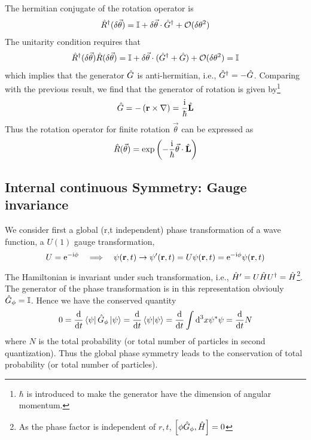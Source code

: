 The hermitian conjugate of the rotation operator is 
\begin{align}
    \hat{R}^ \dag(\delta \vec{\theta}) = \mathbb{I} + \delta \vec{\theta} \cdot \hat G^ \dag+ \mathcal{O}(\delta \theta^2)
\end{align}
The unitarity condition requires that
\begin{align}
    \hat{R}^ \dag(\delta \vec{\theta}) \hat{R}(\delta \vec{\theta}) = \mathbb{I} + \delta \vec{\theta} \cdot (\hat G^ \dag + \hat G) + \mathcal{O}(\delta \theta^2) = \mathbb{I}
\end{align}
which implies that the generator $\hat G$ is anti-hermitian, i.e., $\hat G^ \dag = - \hat G$. Comparing with the previous result, we find that the generator of rotation is given by\footnote{$\hbar$ is introduced to make the generator have the dimension of angular momentum.}
\begin{align}
    \hat G = - \left(\mathbf{r} \times \nabla \right) = \frac{\mathrm{i}}{\hbar} \hat{\mathbf{L}}
\end{align}
Thus the rotation operator for finite rotation $\vec{\theta}$ can be expressed as
\begin{align}
    \hat{R}(\vec{\theta}) = \exp\left(- \frac{\mathrm{i}}{\hbar} \vec{\theta} \cdot \hat{\mathbf{L}}\right)    
\end{align}

\subsection{Internal continuous Symmetry: Gauge invariance}
We consider first a global (r,t independent) phase transformation of a wave function, a $U(1)$ gauge transformation, 
\begin{align}
    U = \mathrm{e}^{- \mathrm{i} \phi} \quad \Longrightarrow \quad \psi(\mathbf{r},t) \rightarrow \psi'(\mathbf{r},t) = U \psi(\mathbf{r},t) = \mathrm{e}^{- \mathrm{i} \phi} \psi(\mathbf{r},t)
\end{align}
The Hamiltonian is invariant under such transformation, i.e., $\hat{H}' = U \hat{H} U^ \dag = \hat{H}$\footnote{As the phase factor is independent of $r,t$, $\left[ \phi \hat G_ \phi , \hat{H} \right] = 0$}. The generator of the phase transformation is in this representation obviouly $\hat G_ \phi = \mathbb{I}$. Hence we have the conserved quantity 
\begin{align}
    0 = \frac{\mathrm{d}}{\mathrm{d} t} \bra{\psi} \hat G_ \phi \ket{\psi} = \frac{\mathrm{d}}{\mathrm{d} t} \braket{\psi|\psi} = \frac{\mathrm{d}}{\mathrm{d} t} \int \mathrm{d}^3 x \psi^* \psi =\frac{\mathrm{d}}{\mathrm{d} t} N
\end{align}
where $N$ is the total probability (or total number of particles in second quantization). Thus the global phase symmetry leads to the conservation of total probability (or total number of particles).

